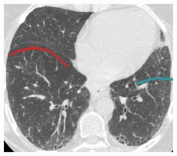 {\begin{figure}[htbp]
\begin{subfigure}{.32\linewidth}
  \includegraphics[width=\linewidth,trim={{.0\wd0} {.0\wd0} {.0\wd0} {.0\wd0}},clip]{Segmentation/Image/IPF203_PCAGuessing125_Axial.png}
  \caption{}
  \label{fig:IPFSegmentationResults-e} 
\end{subfigure}

\end{figure}}
